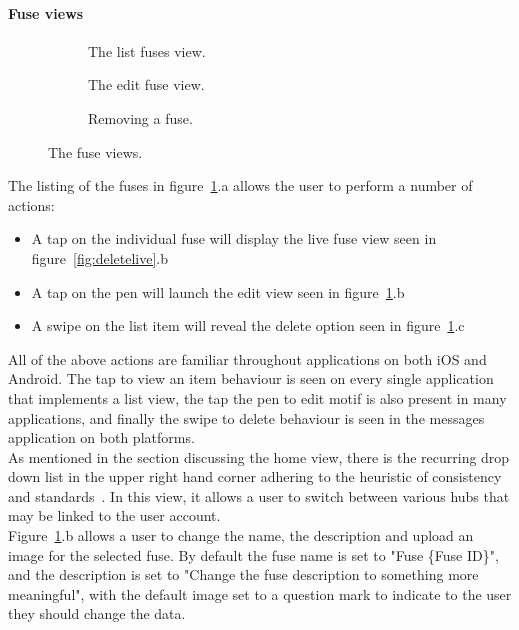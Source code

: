\documentclass[draft,preprint,12pt,3p]{elsarticle}
\begin{document}
\paragraph{Fuse views}
\begin{figure}[H]
    \centering
    \begin{subfigure}[t]{0.32\columnwidth}
        \centering
        \caption{The list fuses view.}
    \end{subfigure}
    \begin{subfigure}[t]{0.32\columnwidth}
        \centering
        \caption{The edit fuse view.}
    \end{subfigure}
    \begin{subfigure}[t]{0.32\columnwidth}
        \centering
        \caption{Removing a fuse.}
    \end{subfigure}
    \caption{The fuse views.}
    \label{fig:fuseviews}
\end{figure}
The listing of the fuses in figure~\ref{fig:fuseviews}.a allows the user to perform a number of actions:
\begin{itemize}
\item A tap on the individual fuse will display the live fuse view seen in figure~\ref{fig:deletelive}.b
\item A tap on the pen will launch the edit view seen in figure~\ref{fig:fuseviews}.b
\item A swipe on the list item will reveal the delete option seen in figure~\ref{fig:fuseviews}.c
\end{itemize}
All of the above actions are familiar throughout applications on both iOS and Android. The tap to view an item behaviour is seen on every single application that implements a list view, the tap the pen to edit motif is also present in many applications, and finally the swipe to delete behaviour is seen in the messages application on both platforms.\\
As mentioned in the section discussing the home view, there is the recurring drop down list in the upper right hand corner adhering to the heuristic of consistency and standards~\cite{nielsen}. In this view, it allows a user to switch between various hubs that may be linked to the user account.\\
Figure~\ref{fig:fuseviews}.b allows a user to change the name, the description and upload an image for the selected fuse. By default the fuse name is set to "Fuse \{Fuse ID\}", and the description is set to "Change the fuse description to something more meaningful", with the default image set to a question mark to indicate to the user they should change the data.\\
\end{document}
